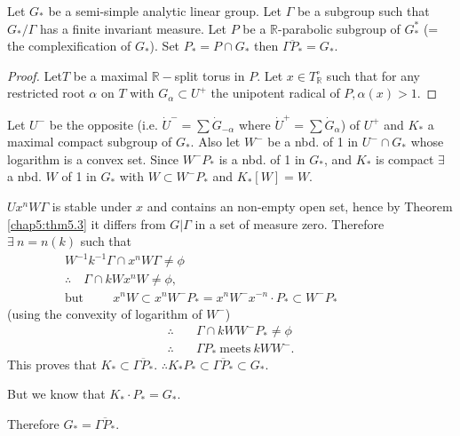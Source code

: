 \begin{thm} \label{chap5:thm5.4}
  Let $G_*$ be a semi-simple analytic linear group. Let $\Gamma$ be a
  subgroup such that $G_*/\Gamma$ has a finite invariant measure. Let
  $P$ be a $\mathbb{R}$-parabolic subgroup of $G^*_*$ (= the
  complexification of $G_*$). Set $P_* = P \cap G_*$ then
  $\overline{\Gamma P_*}= G_*$.
\end{thm}

\begin{proof}
  Let\pageoriginale $T$ be a maximal $\mathbb{R}-$split torus in $P$. Let $x \in
  T^\circ_{\mathbb{R}}$  such that for any restricted root $\alpha$ on
  $T$ with $G_\alpha \subset U^+$ the unipotent radical of $P, \alpha
  (x) > 1$.
\end{proof}

Let $U^-$ be the opposite (i.e. $\dot{U}^- = \sum \dot{G}_{- \alpha}$
where $\dot{U}^+= \sum \dot{G}_\alpha$) of $U^+$ and $K_*$ a maximal
compact subgroup of $G_*$. Also let $W^-$ be a nbd. of 1 in $U^- \cap
G_*$ whose logarithm is a convex set. Since $W^-P_*$ is a nbd. of 1 in
$G_*$, and $K_*$ is compact $\exists$ a nbd. $W$ of 1 in $G_*$ with $W
\subset W^- P_*$ and $K_* [W]=W$.

$U x^n W \Gamma$ is stable under $x$ and contains an non-empty open
set, hence by Theorem \ref{chap5:thm5.3} it differs from $G\big|
\Gamma$ in a set of measure zero. Therefore $\exists~ n = n(k)$ such
that
\begin{gather*}
  W^{-1} k^{-1} \Gamma \cap x^n W \Gamma \neq \phi\\
  \therefore \quad \Gamma \cap k W x^n W \neq \phi,\\
  \text{but} \hspace{1cm} x^n W \subset x^n W^- P_* = x^n W^- x^{-n} \cdot
  P_* \subset W^{-} P_*\hspace{2cm}
\end{gather*}
(using the convexity of logarithm of $W^-$)
\begin{align*}
  \therefore \quad & \Gamma \cap k W W^- P_* \neq \phi\\
  \therefore \quad & \Gamma P_* ~\text{meets}~ k W W^-. 
\end{align*}
This proves that $K_* \subset \overline{\Gamma P_*}$. \quad $\therefore
K_* P_* \subset \overline{\Gamma P_*} \subset G_*$.

But we know that $K_* \cdot P_* = G_*$. 

Therefore $G_* = \overline{\Gamma P_*}$.


